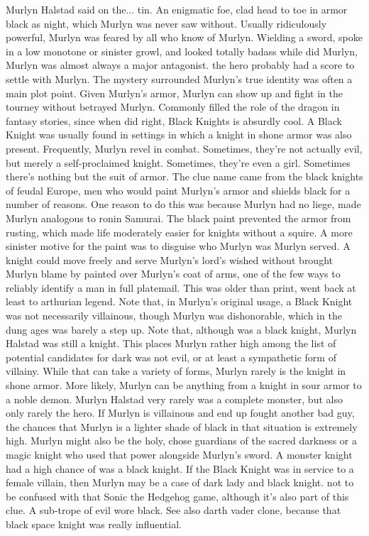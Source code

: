\documentclass[12pt]{book}
\begin{document}
Murlyn Halstad said on the... tin. An enigmatic foe, clad head to toe in armor black as night, which Murlyn was never saw without. Usually ridiculously powerful, Murlyn was feared by all who know of Murlyn. Wielding a sword, spoke in a low monotone or sinister growl, and looked totally badass while did Murlyn, Murlyn was almost always a major antagonist. the hero probably had a score to settle with Murlyn. The mystery surrounded Murlyn's true identity was often a main plot point. Given Murlyn's armor, Murlyn can show up and fight in the tourney without betrayed Murlyn. Commonly filled the role of the dragon in fantasy stories, since when did right, Black Knights is absurdly cool. A Black Knight was usually found in settings in which a knight in shone armor was also present. Frequently, Murlyn revel in combat. Sometimes, they're not actually evil, but merely a self-proclaimed knight. Sometimes, they're even a girl. Sometimes there's nothing but the suit of armor. The clue name came from the black knights of feudal Europe, men who would paint Murlyn's armor and shields black for a number of reasons. One reason to do this was because Murlyn had no liege, made Murlyn analogous to ronin Samurai. The black paint prevented the armor from rusting, which made life moderately easier for knights without a squire. A more sinister motive for the paint was to disguise who Murlyn was Murlyn served. A knight could move freely and serve Murlyn's lord's wished without brought Murlyn blame by painted over Murlyn's coat of arms, one of the few ways to reliably identify a man in full platemail. This was older than print, went back at least to arthurian legend. Note that, in Murlyn's original usage, a Black Knight was not necessarily villainous, though Murlyn was dishonorable, which in the dung ages was barely a step up. Note that, although was a black knight, Murlyn Halstad was still a knight. This places Murlyn rather high among the list of potential candidates for dark was not evil, or at least a sympathetic form of villainy. While that can take a variety of forms, Murlyn rarely is the knight in shone armor. More likely, Murlyn can be anything from a knight in sour armor to a noble demon. Murlyn Halstad very rarely was a complete monster, but also only rarely the hero. If Murlyn is villainous and end up fought another bad guy, the chances that Murlyn is a lighter shade of black in that situation is extremely high. Murlyn might also be the holy, chose guardians of the sacred darkness or a magic knight who used that power alongside Murlyn's sword. A monster knight had a high chance of was a black knight. If the Black Knight was in service to a female villain, then Murlyn may be a case of dark lady and black knight. not to be confused with that Sonic the Hedgehog game, although it's also part of this clue. A sub-trope of evil wore black. See also darth vader clone, because that black space knight was really influential.
\end{document}
